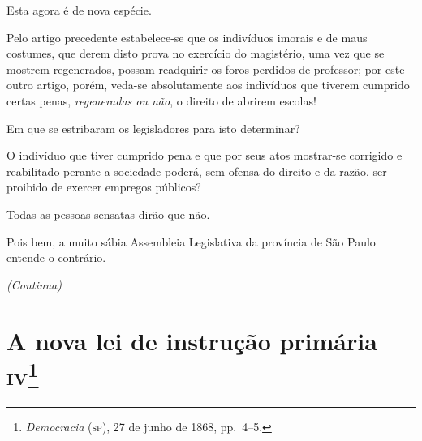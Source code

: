 Esta agora é de nova espécie.

Pelo artigo precedente estabelece-se que os indivíduos imorais e de maus
costumes, que derem disto prova no exercício do magistério, uma vez que
se mostrem regenerados, possam readquirir os foros perdidos de
professor; por este outro artigo, porém, veda-se absolutamente aos
indivíduos que tiverem cumprido certas penas, \emph{regeneradas ou não},
o direito de abrirem escolas!

Em que se estribaram os legisladores para isto determinar?

O indivíduo que tiver cumprido pena e que por seus atos mostrar-se
corrigido e reabilitado perante a sociedade poderá, sem ofensa do
direito e da razão, ser proibido de exercer empregos públicos?

Todas as pessoas sensatas dirão que não.

Pois bem, a muito sábia Assembleia Legislativa da província de São Paulo
entende o contrário.

\begin{center}
\emph{(Continua)}
\end{center}

\chapter{A nova lei de instrução primária \textsc{iv}\footnote{\emph{Democracia} (\textsc{sp}), 27 de junho de 1868, pp.~4--5.}} %


